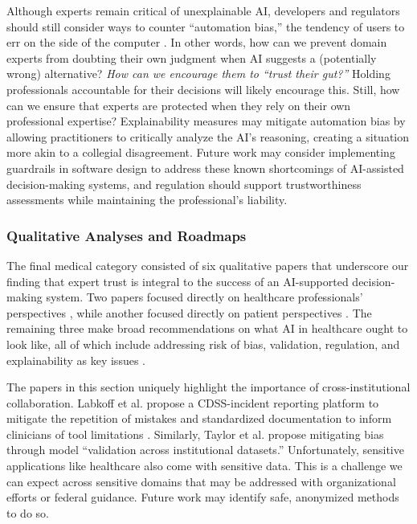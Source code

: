\documentclass[authoryear,preprint,12pt]{elsarticle}
\begin{document}
Although experts remain critical of unexplainable AI, developers and regulators
should still consider ways to counter ``automation bias,'' the tendency of users
to err on the side of the computer
\cite{jonesArtificialIntelligenceClinical2023}. In other words, how can we
prevent domain experts from doubting their own judgment when AI suggests a
(potentially wrong) alternative? \textit{How can we encourage them to ``trust
their gut?''} Holding professionals accountable for their decisions will likely
encourage this. Still, how can we ensure that experts are protected when they
rely on their own professional expertise? Explainability measures may mitigate
automation bias by allowing practitioners to critically analyze the AI's
reasoning, creating a situation more akin to a collegial disagreement. Future
work may consider implementing guardrails in software design to address these
known shortcomings of AI-assisted decision-making systems, and regulation should
support trustworthiness assessments while maintaining the professional's
liability.

\subsubsection{Qualitative Analyses and Roadmaps}
\label{sec:qualitative}
The final medical category consisted of six qualitative papers that underscore
our finding that expert trust is integral to the success of an AI-supported
decision-making system. Two papers focused directly on healthcare professionals'
perspectives \cite{nouisEvaluatingAccountabilityTransparency2025,kingPotentialUsesAI2023}, while another focused directly on patient
perspectives \cite{fransenPatientPerspectivesUse2025}. The remaining three make
broad recommendations on what AI in healthcare ought to look like, all of which
include addressing risk of bias, validation, regulation, and explainability as
key issues \cite{labkoffResponsibleFutureRecommendations2024,fuchsLindberghsCockpitPredictive2025,taylorLeveragingArtificialIntelligence2025}. 

The papers in this section uniquely highlight the importance of
cross-institutional collaboration. Labkoff et al.
\cite{labkoffResponsibleFutureRecommendations2024} propose a CDSS-incident
reporting platform to mitigate the repetition of mistakes and standardized
documentation to inform clinicians of tool limitations
\cite{labkoffResponsibleFutureRecommendations2024}. Similarly, Taylor et al.
\cite{taylorLeveragingArtificialIntelligence2025} propose mitigating bias
through model ``validation across institutional datasets.'' Unfortunately,
sensitive applications like healthcare also come with sensitive data. This is a
challenge we can expect across sensitive domains that may be addressed with
organizational efforts or federal guidance. Future work may identify safe,
anonymized methods to do so. 
\end{document}
